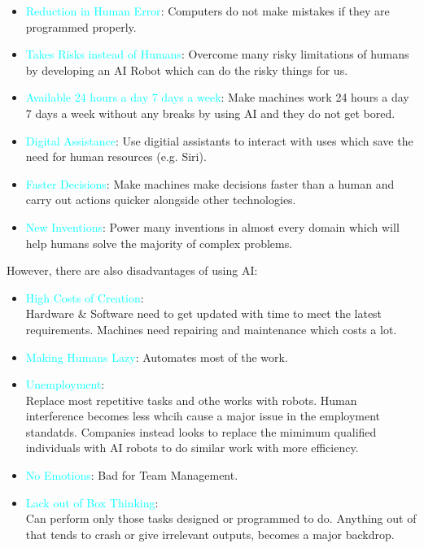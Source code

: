 \documentclass{book}
\begin{document}
\begin{itemize}
    \item \textcolor{cyan}{Reduction in Human Error}: Computers do not make mistakes if they are programmed properly.
    \item \textcolor{cyan}{Takes Risks instead of Humans}: Overcome many risky limitations of humans by developing an AI Robot which can do the risky things for us.
    \item \textcolor{cyan}{Available 24 hours a day 7 days a week}: Make machines work 24 hours a day 7 days a week without any breaks by using AI and they do not get bored.
    \item \textcolor{cyan}{Digital Assistance}: Use digitial assistants to interact with uses which save the need for human resources (e.g. Siri).
    \item \textcolor{cyan}{Faster Decisions}: Make machines make decisions faster than a human and carry out actions quicker alongside other technologies.
    \item \textcolor{cyan}{New Inventions}: Power many inventions in almost every domain which will help humans solve the majority of complex problems.   
\end{itemize}
\newpage
However, there are also disadvantages of using AI:
\begin{itemize}
    \item \textcolor{cyan}{High Costs of Creation}: \\ Hardware \& Software need to get updated with time to meet the latest requirements. Machines need repairing and maintenance which costs a lot.
    \item \textcolor{cyan}{Making Humans Lazy}: Automates most of the work.
    \item \textcolor{cyan}{Unemployment}: \\ Replace most repetitive tasks and othe works with robots.
    Human interference becomes less whcih cause a major issue in the employment standatds. 
    Companies instead looks to replace the mimimum qualified individuals with AI robots to do similar work with more efficiency.
    \item \textcolor{cyan}{No Emotions}: Bad for Team Management.
    \item \textcolor{cyan}{Lack out of Box Thinking}: \\ Can perform only those tasks designed or programmed to do. Anything out of that tends to crash or give irrelevant outputs, becomes a major backdrop.
\end{itemize}
\end{document}
